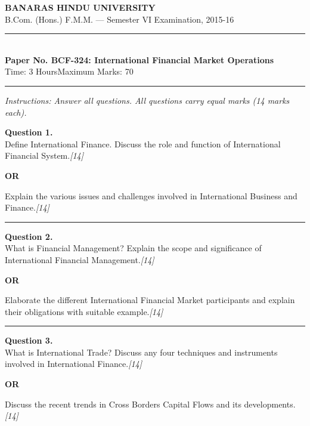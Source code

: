 \documentclass[11pt,a4paper]{article}
\newcommand{\pts}[1]{\hfill   \textit{[#1]}}
\begin{document}
\begin{center}
  {\large\bfseries BANARAS HINDU UNIVERSITY}\\[2pt]
  {\normalsize B.Com. (Hons.) F.M.M. --- Semester VI Examination, 2015-16}\\[6pt]
  \rule{0.8\linewidth}{0.5pt}\\[6pt]
  {\large\bfseries Paper No. BCF-324: International Financial Market Operations}\\[4pt]
  {\normalsize Time: 3 Hours\hfill Maximum Marks: 70}
\end{center}

\rule{\linewidth}{0.4pt}

\smallskip



\noindent   \textit{Instructions: Answer all questions. All questions carry equal marks (14 marks each).}

\bigskip




\noindent   \textbf{Question 1.} \\
Define International Finance. Discuss the role and function of International Financial System.\pts{14}

\centerline{   \textbf{OR}}

Explain the various issues and challenges involved in International Business and Finance.\pts{14}

\medskip\rule{\linewidth}{0.2pt}




\noindent   \textbf{Question 2.} \\
What is Financial Management? Explain the scope and significance of International Financial Management.\pts{14}

\centerline{   \textbf{OR}}

Elaborate the different International Financial Market participants and explain their obligations with suitable example.\pts{14}

\medskip\rule{\linewidth}{0.2pt}

\pagebreak




\noindent   \textbf{Question 3.} \\
What is International Trade? Discuss any four techniques and instruments involved in International Finance.\pts{14}

\centerline{   \textbf{OR}}

Discuss the recent trends in Cross Borders Capital Flows and its developments.\pts{14}
\end{document}
